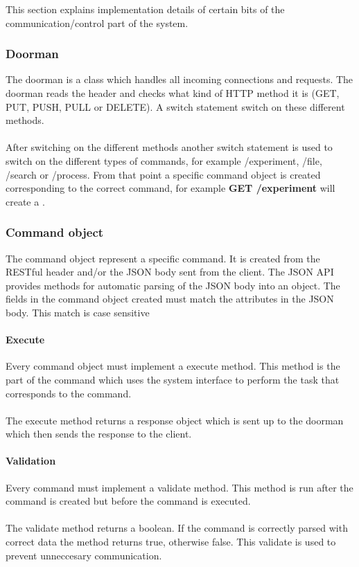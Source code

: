 This section explains implementation details of certain bits of the communication/control part of the system.
\subsubsection{Doorman}
The doorman is a class which handles all incoming connections and requests. The doorman reads the header and checks what kind of HTTP method it is (GET, PUT, PUSH, PULL or DELETE). A switch statement switch on these different methods.\\
\\
After switching on the different methods another switch statement is used to switch on the different types of commands, for example /experiment, /file, /search or /process. From that point a specific command object is created corresponding to the correct command, for example \textbf{GET /experiment} will create a .
\subsubsection{Command object}
The command object represent a specific command. It is created from the RESTful header and/or the JSON body sent from the client. The JSON API provides methods for automatic parsing of the JSON body into an object. The fields in the command object created must match the attributes in the JSON body. This match is case sensitive

\paragraph{Execute}
Every command object must implement a execute method. This method is the part of the command which uses the system interface to perform the task that corresponds to the command.\\
\\
The execute method returns a response object which is sent up to the doorman which then sends the response to the client. 
\paragraph{Validation}
Every command must implement a validate method. This method is run after the command is created but before the command is executed.\\
\\
The validate method returns a boolean. If the command is correctly parsed with correct data the method returns true, otherwise false. This validate is used to prevent unneccesary communication.
